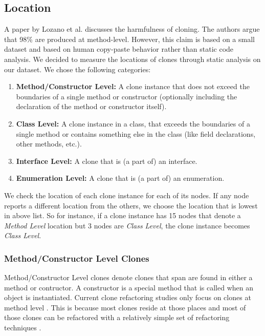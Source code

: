 \subsection{Location}\label{sec:setuplocation}
A paper by Lozano et al. \cite{lozano2007evaluating} discusses the harmfulness of cloning. The authors argue that 98\% are produced at method-level. However, this claim is based on a small dataset and based on human copy-paste behavior rather than static code analysis. We decided to measure the locations of clones through static analysis on our dataset. We chose the following categories:
\begin{enumerate}
  \item \textbf{Method/Constructor Level:} A clone instance that does not exceed the boundaries of a single method or constructor (optionally including the declaration of the method or constructor itself).
  \item \textbf{Class Level:} A clone instance in a class, that exceeds the boundaries of a single method or contains something else in the class (like field declarations, other methods, etc.).
  \item \textbf{Interface Level:} A clone that is (a part of) an interface.
  \item \textbf{Enumeration Level:} A clone that is (a part of) an enumeration.
\end{enumerate}
We check the location of each clone instance for each of its nodes. If any node reports a different location from the others, we choose the location that is lowest in above list. So for instance, if a clone instance has 15 nodes that denote a \textit{Method Level} location but 3 nodes are \textit{Class Level}, the clone instance becomes \textit{Class Level}.

\subsubsection{Method/Constructor Level Clones} \label{sec:methodlevelcr}
Method/Constructor Level clones denote clones that span are found in either a method or contructor. A constructor is a special method that is called when an object is instantiated. Current clone refactoring studies only focus on clones at method level \cite{choi2011extracting, yue2018automatic, kodhai2013method, arcelli2013software, lin2014clonepedia, mandal2014automatic, balazinska2000advanced, yongting2018detection, bouktif2006novel, fanqi2014using, devi2016study}. This is because most clones reside at those places \cite{lozano2007evaluating, fontana2015duplicated} and most of those clones can be refactored with a relatively simple set of refactoring techniques \cite{kodhai2013method, fontana2015duplicated}.

